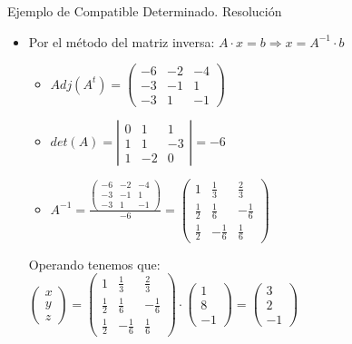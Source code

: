 \documentclass[11pt]{beamer}
\begin{document}
\begin{frame}{Ejemplo de Compatible Determinado. Resolución}

\begin{itemize}[<+->]
    \item Por el método del matriz inversa: $A\cdot x=b \Rightarrow x=A^{-1}\cdot b$
    
        \begin{itemize}[<+->]
            \item $Adj(A^t)=\left(\begin{matrix}-6 & -2 & -4\\-3 & -1 & 1\\-3 & 1 & -1\end{matrix}\right)$
            \item $det(A)=\left|\begin{matrix}0 & 1 & 1\\1 & 1 & -3\\1 & -2 & 0\end{matrix}\right|=-6$
            \item $A^{-1}=\frac{\left(\begin{matrix}-6 & -2 & -4\\-3 & -1 & 1\\-3 & 1 & -1\end{matrix}\right)}{-6}=\left(\begin{matrix}1 & \frac{1}{3} & \frac{2}{3}\\\frac{1}{2} & \frac{1}{6} & - \frac{1}{6}\\\frac{1}{2} & - \frac{1}{6} & \frac{1}{6}\end{matrix}\right)$
        \end{itemize}
        \pause
        Operando tenemos que: \\
        $\left(\begin{matrix}x\\y\\z\end{matrix}\right)=\left(\begin{matrix}1 & \frac{1}{3} & \frac{2}{3}\\\frac{1}{2} & \frac{1}{6} & - \frac{1}{6}\\\frac{1}{2} & - \frac{1}{6} & \frac{1}{6}\end{matrix}\right) \cdot \left(\begin{matrix}1\\8\\-1\end{matrix}\right)=\left(\begin{matrix}3\\2\\-1\end{matrix}\right)$
        
\end{itemize}
\end{frame}
\end{document}
